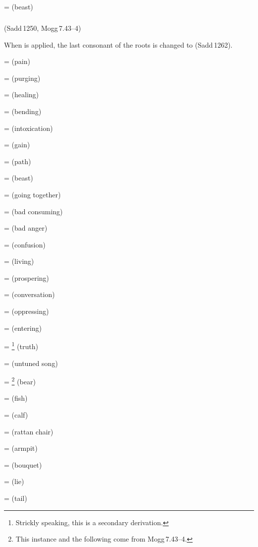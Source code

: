  =  (beast)\par

\subparagraph*{} (Sadd\,1250, Mogg\,7.43--4)\label{pacckx:cha}

When  is applied, the last consonant of the roots is changed to  (Sadd\,1262).

 =  (pain)\par
{} =  (purging)\par
{} =  (healing)\par
{} =  (bending)\par
{} =  (intoxication)\par
{} =  (gain)\par
{} =  (path)\par
{} =  (beast)\par
{} =  (going together)\par
{} =  (bad consuming)\par
{} =  (bad anger)\par
{} =  (confusion)\par
{} =  (living)\par
{} =  (prospering)\par
{} =  (conversation)\par
{} =  (oppressing)\par
{} =  (entering)\par
{} = \footnote{Strickly speaking, this is a secondary derivation.} (truth)\par
{} =  (untuned song)\par
{} = \footnote{This instance and the following come from Mogg\,7.43--4.} (bear)\par
{} =  (fish)\par
{} =  (calf)\par
{} =  (rattan chair)\par
{} =  (armpit)\par
{} =  (bouquet)\par
{} =  (lie)\par
{} =  (tail)\par

